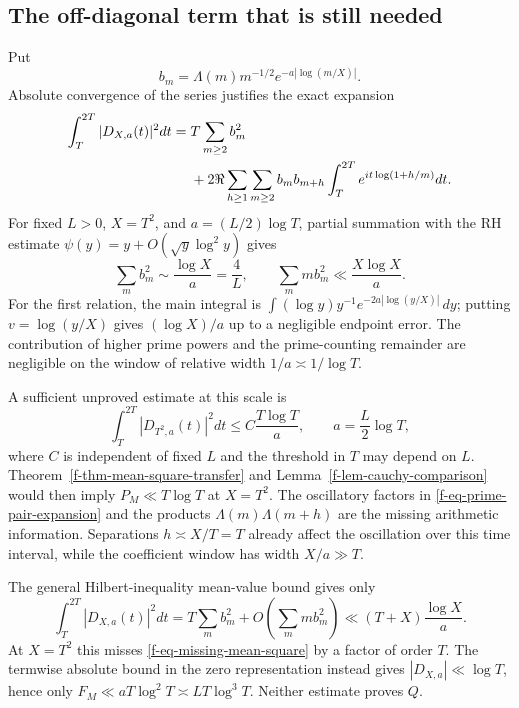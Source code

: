 \documentclass[11pt,a4paper]{article}
\theoremstyle{definition}
\theoremstyle{remark}
\begin{document}
\subsection{The off-diagonal term that is still needed}
\label{f-sub-off-diagonal}

Put
\[
 b_m=\Lambda(m)m^{-1/2}e^{-a|\log(m/X)|}.
\]
Absolute convergence of the series justifies the exact expansion
\begin{align}
 \int_T^{2T}|D_{X,a}(t)|^2dt
 ={}&T\sum_{m\ge2}b_m^2
 \notag\\
 &+2\Re\sum_{h\ge1}\sum_{m\ge2}b_mb_{m+h}
 \int_T^{2T}e^{it\log(1+h/m)}dt.
 \label{f-eq-prime-pair-expansion}
\end{align}
For fixed $L>0$, $X=T^2$, and $a=(L/2)\log T$, partial summation with
the RH estimate $\psi(y)=y+O(\sqrt y\log^2 y)$ gives
\begin{equation}
 \sum_m b_m^2\sim\frac{\log X}{a}=\frac4L,
 \qquad
 \sum_m mb_m^2\ll\frac{X\log X}{a}.
 \label{f-eq-diagonal-evaluation}
\end{equation}
For the first relation, the main integral is
$\int (\log y)y^{-1}e^{-2a|\log(y/X)|}\,dy$; putting
$v=\log(y/X)$ gives $(\log X)/a$ up to a negligible endpoint error.
The contribution of higher prime powers and the prime-counting remainder
are negligible on the window of relative width $1/a\asymp1/\log T$.

A sufficient unproved estimate at this scale is
\begin{equation}
 \int_T^{2T}|D_{T^2,a}(t)|^2dt
 \le C\frac{T\log T}{a},\qquad a=\frac L2\log T,
 \label{f-eq-missing-mean-square}
\end{equation}
where $C$ is independent of fixed $L$ and the threshold in $T$ may depend
on $L$.  Theorem~\ref{f-thm-mean-square-transfer} and
Lemma~\ref{f-lem-cauchy-comparison} would then imply
$P_M\ll T\log T$ at $X=T^2$.  The oscillatory factors in
\eqref{f-eq-prime-pair-expansion} and the products
$\Lambda(m)\Lambda(m+h)$ are the missing arithmetic information.
Separations $h\asymp X/T=T$ already affect the oscillation over this
time interval, while the coefficient window has width $X/a\gg T$.

The general Hilbert-inequality mean-value bound
\cite{f-montgomery-vaughan} gives only
\begin{equation}
 \int_T^{2T}|D_{X,a}(t)|^2dt
 =T\sum_m b_m^2+O\!\left(\sum_m mb_m^2\right)
 \ll(T+X)\frac{\log X}{a}.
 \label{f-eq-hilbert-loss}
\end{equation}
At $X=T^2$ this misses \eqref{f-eq-missing-mean-square} by a factor of
order $T$.  The termwise absolute bound in the zero representation instead
gives $|D_{X,a}|\ll\log T$, hence only
$F_M\ll aT\log^2T\asymp L T\log^3T$.  Neither estimate proves $Q$.
\end{document}
